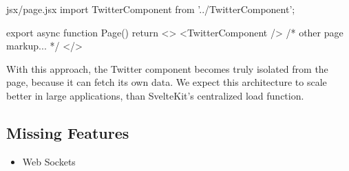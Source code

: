 \begin{myminted}{jsx}{/page.jsx}
import TwitterComponent from '../TwitterComponent';

export async function Page() {
    return <>
        <TwitterComponent />
        { /* other page markup... */ }
    </>
}
\end{myminted}

With this approach, the Twitter component becomes truly isolated from the page, because it can fetch its own data. We expect this architecture to scale better in large applications, than SvelteKit's centralized load function.

\subsection{Missing Features}

\begin{itemize}
    \item Web Sockets
\end{itemize}


